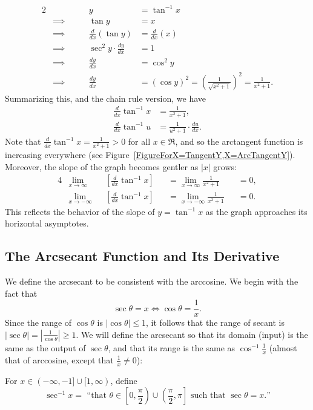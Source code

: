 \begin{alignat*}{2}
&&y&=\tan^{-1}x\\
&\implies\qquad&\tan y&=x\\
&\implies&\frac{d}{dx}(\tan y)&=\frac{d}{dx}(x)\\
&\implies&\sec^2y\cdot\frac{dy}{dx}&=1\\
&\implies&\frac{dy}{dx}&=\cos^2y\\
&\implies&\frac{dy}{dx}&=(\cos y)^2=\left(\frac1{\sqrt{x^2+1}}\right)^2
 =\frac1{x^2+1}.\end{alignat*}
Summarizing this, and the chain rule version, we have
\begin{align}
\frac{d}{dx}\tan^{-1}x&=\frac1{x^2+1},\label{DerivOfArcTanX}\\
\frac{d}{dx}\tan^{-1}u&=\frac1{u^2+1}\cdot\frac{du}{dx}.
   \label{ChainRuleDerivOfArcTanX}
\end{align}
Note that $\frac{d}{dx}\tan^{-1}x=\frac1{x^2+1}>0$ for all $x\in\Re$,
and so the arctangent function is increasing everywhere
(see Figure~\ref{FigureForX=TangentY,X=ArcTangentY}).  Moreover,
the slope of the graph becomes gentler as $|x|$ grows:
\begin{alignat*}{4}&\lim_{x\to\infty}&&\left[\frac{d}{dx}\tan^{-1}x\right]&&=
         \lim_{x\to\infty}\frac1{x^2+1}&&=0,\\
&\lim_{x\to-\infty}&&\left[\frac{d}{dx}\tan^{-1}x\right]&&=
         \lim_{x\to-\infty}\frac1{x^2+1}&&=0.\end{alignat*}
This reflects 
the behavior of the slope of $y=\tan^{-1}x$ as the graph approaches
its horizontal asymptotes.

\subsection{The Arcsecant Function and Its Derivative}
We define the arcsecant to be consistent with the arccosine.
We begin with the fact that
$$\sec\theta=x\iff\cos \theta=\frac1x.$$
Since the range of $\cos\theta$ is $|\cos\theta|\le1$,
it follows that the range of secant is
$|\sec\theta|=\left|\frac1{\cos\theta}\right|\ge1$.
We will define the arcsecant so that its domain (input) is 
the same as the output of $\sec\theta$, and that its range is the
same as $\cos^{-1}\frac1x$ (almost that of arccosine, except 
that $\frac1x\ne0$):
\begin{definition}
For $x\in(-\infty,-1]\cup[1,\infty)$, define
\begin{equation}\sec^{-1}x=\text{ ``that }\theta\in
   \left.\left[0,\frac{\pi}2\right.\right)\cup
   \left.\left(\frac{\pi}2,\pi\right.\right]
   \text{ such that }\sec\theta=x.\text{''} \label{EquationDefiningArcSecantX}
\end{equation}
\label{DefinitionOfArcSecantX}
\end{definition}

